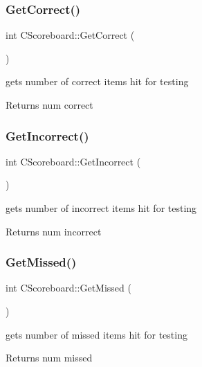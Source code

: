 \subsubsection{\texorpdfstring{GetCorrect()}{GetCorrect()}}
{\footnotesize\ttfamily int C\+Scoreboard\+::\+Get\+Correct (\begin{DoxyParamCaption}{ }\end{DoxyParamCaption})\hspace{0.3cm}{\ttfamily [inline]}}

gets number of correct items hit for testing \begin{DoxyReturn}{Returns}
num correct 
\end{DoxyReturn}
\mbox{\label{class_c_scoreboard_a230139e41c56f0aacf3a82b41034db27}} 
\subsubsection{\texorpdfstring{GetIncorrect()}{GetIncorrect()}}
{\footnotesize\ttfamily int C\+Scoreboard\+::\+Get\+Incorrect (\begin{DoxyParamCaption}{ }\end{DoxyParamCaption})\hspace{0.3cm}{\ttfamily [inline]}}

gets number of incorrect items hit for testing \begin{DoxyReturn}{Returns}
num incorrect 
\end{DoxyReturn}
\mbox{\label{class_c_scoreboard_a99d95c0502e4ca08a2cf867568998065}} 
\subsubsection{\texorpdfstring{GetMissed()}{GetMissed()}}
{\footnotesize\ttfamily int C\+Scoreboard\+::\+Get\+Missed (\begin{DoxyParamCaption}{ }\end{DoxyParamCaption})\hspace{0.3cm}{\ttfamily [inline]}}

gets number of missed items hit for testing \begin{DoxyReturn}{Returns}
num missed 
\end{DoxyReturn}
\mbox{\label{class_c_scoreboard_a86ec1f448410e12d88939ebaa5292a29}} 
